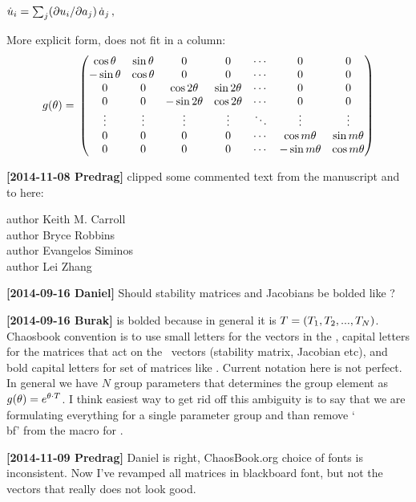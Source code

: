 \( %
 \dot{ u}_i= \sum_j ({\partial u_i}/{\partial \ssp_j}) \, \dot{\ssp}_j
 \,,
\) %


More explicit form, does not fit in a column:
\[
	 g (\theta)= \\
					  \begin{pmatrix}
					  \cos \theta & \sin \theta & 0               & 0              & \cdots & 0              & 0               \\
					 -\sin \theta & \cos \theta & 0               & 0              & \cdots & 0              & 0               \\
					  0             & 0 		   & \cos 2 \theta & \sin 2 \theta & \cdots & 0              & 0               \\
					  0             & 0            &-\sin 2 \theta & \cos 2 \theta & \cdots & 0              & 0               \\
					  \vdots       & \vdots      & \vdots         & \vdots        & \ddots & \vdots         & \vdots         \\
					  0             & 0 		   & 0               & 0              & \cdots & \cos m \theta & \sin m \theta  \\
					  0             & 0            & 0	             & 0              & \cdots &-\sin m \theta & \cos m \theta
					  \end{pmatrix}
\]


{\bf[2014-11-08 Predrag]} clipped some commented text from the manuscript
and to here:

\noindent
author{ Keith M. Carroll} \\%
author{ Bryce Robbins} \\%
author{ Evangelos Siminos}  \\ %
author{ Lei Zhang} %

{\bf[2014-09-16 Daniel]}
Should stability matrices and Jacobians be bolded like \Lg?

{\bf[2014-09-16 Burak]}
\Lg is bolded because in general it is ${T} = ({T}_1,
{T}_2, ..., {T}_N)$. Chaosbook convention is to use small letters for the
vectors in the \statesp , capital letters for the matrices that act on
the \statesp\ vectors (stability matrix, Jacobian etc), and bold capital
letters for set of matrices like \Lg . Current notation here is not
perfect. In general we have $N$ group parameters that determines the
group element as $g({\bf \theta}) = e^{\theta \cdot {T}}$. I think easiest way
to get rid off this ambiguity is to say that we are formulating
everything for a single parameter group and than remove `\\bf' from the
macro for \Lg .

{\bf[2014-11-09 Predrag]}
 Daniel is right, ChaosBook.org choice of fonts is inconsistent.
Now I've revamped all matrices in blackboard font, but not the vectors
that really does not look good.
